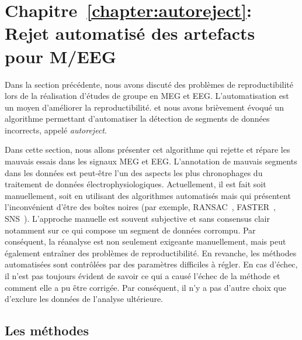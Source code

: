 \clearpage

\section*{Chapitre~\ref{chapter:autoreject}: Rejet automatisé des artefacts pour M/EEG}

Dans la section précédente, nous avons discuté des problèmes de reproductibilité lors de la réalisation d'études de groupe en MEG et EEG. L'automatisation est un moyen d'améliorer la reproductibilité. et nous avons brièvement évoqué un algorithme permettant d’automatiser la détection de segments de données incorrects, appelé \emph{autoreject}.

Dans cette section, nous allons présenter cet algorithme qui rejette et répare les mauvais essais dans les signaux MEG et EEG. L'annotation de mauvais segments dans les données est peut-être l'un des aspects les plus chronophages du traitement de données électrophysiologiques. Actuellement, il est fait soit manuellement, soit en utilisant des algorithmes automatisés mais qui présentent l’inconvénient d’être des boîtes noires (par exemple, RANSAC~\citep{bigdely2015prep}, FASTER~\citep{nolan2010faster}, SNS~\citep{de2008sensor}). L'approche manuelle est souvent subjective et sans consensus clair notamment sur ce qui compose un segment de données corrompu. Par conséquent, la réanalyse est non seulement exigeante manuellement, mais peut également entraîner des problèmes de reproductibilité. En revanche, les méthodes automatisées sont contrôlées par des paramètres difficiles à régler. En cas d'échec, il n'est pas toujours évident de savoir ce qui a causé l'échec de la méthode et comment elle a pu être corrigée. Par conséquent, il n’y a pas d'autre choix que d'exclure les données de l'analyse ultérieure.

\subsection*{Les méthodes}

